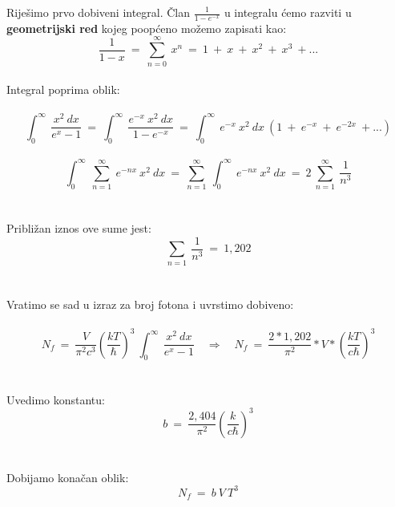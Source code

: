 \documentclass[a4paper,12pt]{article}
\begin{document}
\newpage
Rije\v{s}imo prvo dobiveni integral.
\v{C}lan $\frac{1}{1-e^{-x}}$ u integralu \'cemo razviti u \textbf{geometrijski red} kojeg poop\'ceno mo\v{z}emo zapisati kao:
\\
$$ \frac{1}{1-x}\ =\ \sum_{n=0}^{\infty}\ x^n\ =\ 1\ +\ x\ +\ x^2\ +\ x^3\ +... $$
\\
Integral poprima oblik:
\\
\\
$$ \int_{0}^{\infty}\ \frac{x^2\ dx}{e^x-1}\ =\ \int_{0}^{\infty}\ \frac{e^{-x}\ x^2\ dx}{1-e^{-x}}\ =\ \int_{0}^{\infty}\ e^{-x}\ x^2\ dx\ (1\ +\ e^{-x}\ +\ e^{-2x}\ +...) $$  
\\
$$ \int_{0}^{\infty}\ \sum_{n=1}^{\infty}\ e^{-nx}\ x^2\ dx\ =\ \sum_{n=1}^{\infty}\ \int_{0}^{\infty}\ e^{-nx}\ x^2\ dx\ =\ 2\ \sum_{n=1}^{\infty}\ \frac{1}{n^3} $$
\\
\\
Pribli\v{z}an iznos ove sume jest:
\\
$$ \sum_{n=1}\ \frac{1}{n^3}\ =\ 1,202 $$
\\
\\
Vratimo se sad u izraz za broj fotona i uvrstimo dobiveno:
\\
\\
$$ N_f\ =\ \frac{V}{\pi^2 c^3} \left( \frac{kT}{\hbar} \right)^3\ \int_{0}^{\infty}\ \frac{x^2\ dx}{e^x-1}
\quad \Rightarrow \quad N_f\ =\ \frac{2*1,202}{\pi^2}*V*\left( \frac{kT}{c \hbar} \right)^3 $$
\\
\\
Uvedimo konstantu:
$$ b\ =\ \frac{2,404}{\pi^2} \left( \frac{k}{c \hbar} \right)^3 $$
\\
\\
Dobijamo kona\v{c}an oblik:
\\
$$ N_f\ =\ b\ V\ T^3 $$
\end{document}
